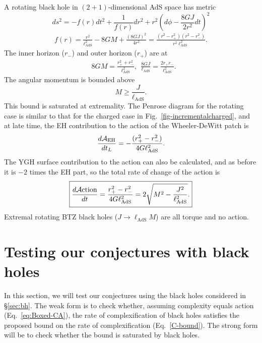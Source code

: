 \documentclass[12pt]{article}
\numberwithin{equation}{section}
\def\CA{{\cal A}}
\newcommand{\lads}{\ell_{\text{AdS}}}
\begin{document}
A rotating black hole in $(2+1)$-dimensional AdS space has metric
\begin{equation}
ds^2=-f(r)dt^2+\frac{1}{f(r)}dr^2+r^2\left(d\phi-\frac{8GJ}{2r^2}dt\right)^2
\end{equation}
\begin{align}
f(r)=\frac{r^2}{\lads^2}-8G M+\frac{(8G J)^2}{4r^2} =\frac{(r^2-r_+^2)(r^2-r_-^2)}{r^2 \lads^2}.
\end{align}
The inner horizon ($r_-$) and outer horizon ($r_+$) are at
\begin{align}
&8G M=\frac{r_+^2+r_-^2}{\lads^2},\ \ \frac{8G J}{\lads}=\frac{2r_+r_-}{\lads^2}. \label{eq:BTZformulaforMJ}
\end{align}
The angular momentum is bounded above
\begin{equation}
M\geq\frac{J}{\lads}.
\end{equation}
This bound is saturated at extremality. The Penrose diagram for the rotating case is similar to that for the charged case in Fig.~\ref{fig-incrementalcharged}, and at late time, the EH contribution to the action of the Wheeler-DeWitt patch is
\begin{align}
\frac{d \CA_{\textrm{EH}}}{dt_L} %
 =-\frac{(r_+^2-r_-^2)}{4G \lads^2}.
\end{align}
The YGH surface contribution to the action can also be calculated, and as before it is $-2$ times the EH part, so the total rate of change of the action is
\begin{align}
\boxed{\frac{d\CA\textrm{ction}}{dt}=\frac{r_+^2-r_-^2}{4G \lads^2}=2\sqrt{M^2-\frac{J^2}{\lads^2}}.}
\label{rothole-action}
\end{align}
{Extremal rotating BTZ black holes ($J \rightarrow \lads M$) are all torque and no action.}






\section{Testing our conjectures with black holes} \label{sec:testingwithbh}

In this section, we will test our conjectures using the black holes considered in  \S\ref{sec:bh}.
The weak form is to check whether, assuming complexity equals action (Eq.~\ref{eq:Boxed-CA}), the rate of complexification of black holes satisfies the proposed bound on the rate of complexification (Eq.~\ref{C-bound}). The strong form will be to check whether the bound is saturated by black holes.
\end{document}
